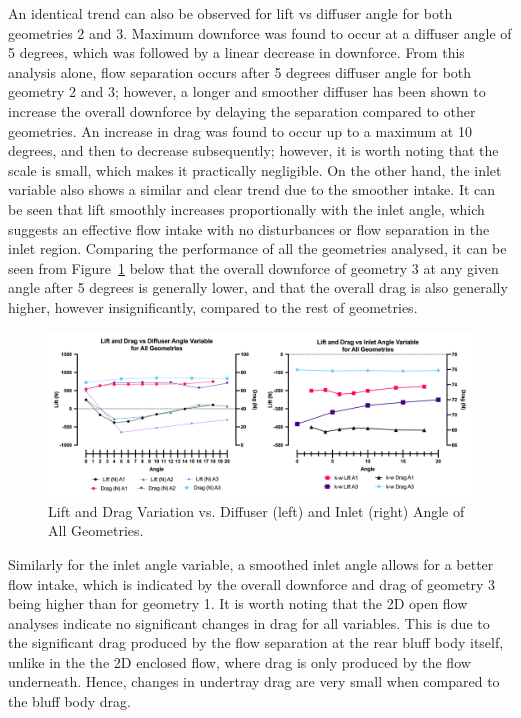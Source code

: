 \noindent An identical trend can also be observed for lift vs diffuser angle for both geometries 2 and 3. Maximum downforce was found to occur at a diffuser angle of 5 degrees, which was followed by a linear decrease in downforce. From this analysis alone, flow separation occurs after 5 degrees diffuser angle for both geometry 2 and 3; however, a longer and smoother diffuser has been shown to increase the overall downforce by delaying the separation compared to other geometries. An increase in drag was found to occur up to a maximum at 10 degrees, and then to decrease subsequently; however, it is worth noting that the scale is small, which makes it practically negligible. On the other hand, the inlet variable also shows a similar and clear trend due to the smoother intake. It can be seen that lift smoothly increases proportionally with the inlet angle, which suggests an effective flow intake with no disturbances or flow separation in the inlet region. Comparing the performance of all the geometries analysed, it can be seen from Figure~\ref{fig:2D_OF_PLOT_COMPARE_ALL} below that the overall downforce of geometry 3 at any given angle after 5 degrees is generally lower, and that the overall drag is also generally higher, however insignificantly, compared to the rest of geometries.

\begin{figure}[htb!]
    \centering
    \includegraphics[scale=0.9]{Figures/2D_OF/2D_OF_PLOT_COMPARE_ALL.png}
    \caption{Lift and Drag Variation vs. Diffuser (left) and Inlet (right) Angle of All Geometries.}
    \label{fig:2D_OF_PLOT_COMPARE_ALL}
\end{figure}

\noindent Similarly for the inlet angle variable, a smoothed inlet angle allows for a better flow intake, which is indicated by the overall downforce and drag of geometry 3 being higher than for geometry 1. It is worth noting that the 2D open flow analyses indicate no significant changes in drag for all variables. This is due to the significant drag produced by the flow separation at the rear bluff body itself, unlike in the the 2D enclosed flow, where drag is only produced by the flow underneath. Hence, changes in undertray drag are very small when compared to the bluff body drag.

